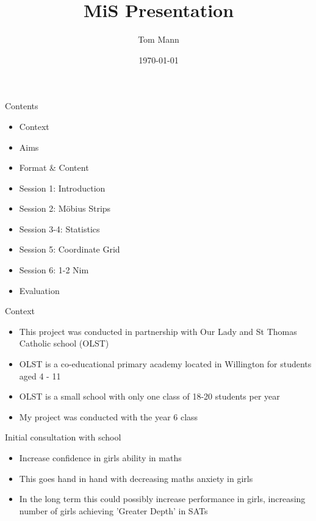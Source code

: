 \documentclass{beamer}  %
\title{MiS Presentation}
\author{Tom Mann}
\date{\today}
\begin{document}
\begin{frame}
    \titlepage
\end{frame}

\begin{frame}{Contents}
    \begin{itemize}
        \item Context
        \item Aims
        \item Format \& Content
        \item Session 1: Introduction
        \item Session 2: M\"{o}bius Strips
        \item Session 3-4: Statistics
        \item Session 5: Coordinate Grid
        \item Session 6: 1-2 Nim
        \item Evaluation
    \end{itemize}
\end{frame}

\begin{frame}{Context}
    \begin{itemize}
        \item This project was conducted in partnership with Our Lady and St Thomas Catholic school (OLST)
        \item OLST is a co-educational primary academy located in Willington for students aged 4 - 11
        \item OLST is a small school with only one class of 18-20 students per year
        \item My project was conducted with the year 6 class
    \end{itemize}
\end{frame}

\begin{frame}{Initial consultation with school}
    \begin{itemize}
        \item Increase confidence in girls ability in maths
        \item This goes hand in hand with decreasing maths anxiety in girls
        \item In the long term this could possibly increase performance in girls, increasing number of girls achieving 'Greater Depth' in SATs
    \end{itemize}
\end{frame}
\end{document}
